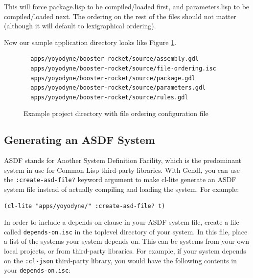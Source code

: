 \documentclass [11pt]{book}
\begin{document}
This will force package.lisp to be compiled/loaded first, and
parameters.lisp to be compiled/loaded next. The ordering on the rest
of the files should not matter (although it will default to
lexigraphical ordering).



Now our sample application directory looks like Figure 
\ref{fig:yoyodyne-with-file-ordering-isc}.


\begin{figure}
\begin{lrbox}{\boxedverb}
\begin{minipage}{\linewidth}

\begin{verbatim}
  apps/yoyodyne/booster-rocket/source/assembly.gdl
  apps/yoyodyne/booster-rocket/source/file-ordering.isc
  apps/yoyodyne/booster-rocket/source/package.gdl
  apps/yoyodyne/booster-rocket/source/parameters.gdl
  apps/yoyodyne/booster-rocket/source/rules.gdl
\end{verbatim}
\end{minipage}
\end{lrbox}
\fbox{\usebox{\boxedverb}}

\caption{Example project directory with file ordering configuration file}

\label{fig:yoyodyne-with-file-ordering-isc}

\end{figure}


\subsection{Generating an ASDF System}

\label{subsec:generatinganasdfsystem}



ASDF stands for Another System Definition Facility, which
	is the predominant system in use for Common Lisp third-party
	libraries. With Gendl, you can use the \texttt{:create-asd-file?} keyword argument to make cl-lite generate an ASDF system
file instead of actually compiling and loading the system. For example: 

\begin{verbatim}(cl-lite "apps/yoyodyne/" :create-asd-file? t)
\end{verbatim}



In order to include a depends-on clause in your ASDF system file, create a file called \texttt{depends-on.isc} in the toplevel directory of your system. In this file,
place a list of the systems your system depends on. This can be
systems from your own local projects, or from third-party libraries.
For example, if your system depends on the \texttt{:cl-json} third-party library, you would have the following contents in your \texttt{depends-on.isc}: 
\end{document}
